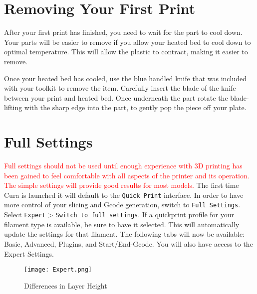 

\section{Removing Your First Print}
After your first print has finished, you need to wait for the part to cool down.  Your parts will be easier to remove if you allow your heated bed to cool down to optimal temperature. This will allow the plastic to contract, making it easier to remove. 

Once your heated bed has cooled, use the blue handled knife that was included with your toolkit to remove the item. Carefully insert the blade of the knife between your print and heated bed. Once underneath the part rotate the blade- lifting with the sharp edge into the part, to gently pop the piece off your plate.

\section{Full Settings}
\textcolor{red}{Full settings should not be used until enough experience with 3D printing has been gained to feel comfortable with all aspects of the printer and its operation. The simple settings will provide good results for most models.}
The first time Cura is launched it will default to the \texttt{Quick Print} interface. In order to have more control of your slicing and Gcode generation, switch to \texttt{Full Settings}. Select \texttt{Expert} > \texttt{Switch to full settings}. If a quickprint profile for your filament type is available, be sure to have it selected. This will automatically update the settings for that filament. The following tabs will now be available: Basic, Advanced, Plugins, and Start/End-Gcode. You will also have access to the Expert Settings. 
\begin{figure}[hbt]
\centering
\texttt{[image: Expert.png]}
\caption{Differences in Layer Height}
\label{fig:Differences in Layer Height}
\end{figure}
